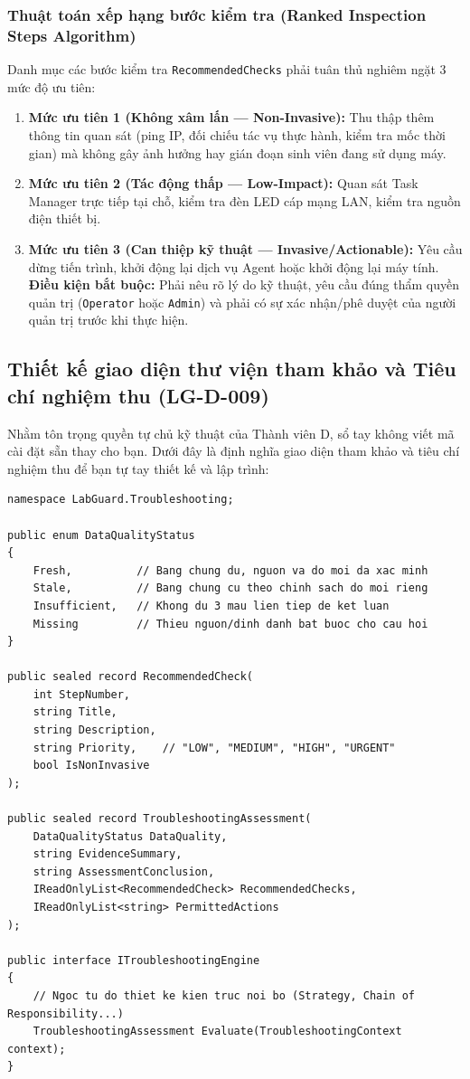 \documentclass[12pt,a4paper]{article}
\begin{document}
\subsubsection{Thuật toán xếp hạng bước kiểm tra (Ranked Inspection Steps Algorithm)}
Danh mục các bước kiểm tra \texttt{RecommendedChecks} phải tuân thủ nghiêm ngặt 3 mức độ ưu tiên:
\begin{enumerate}
  \item \textbf{Mức ưu tiên 1 (Không xâm lấn --- Non-Invasive):} Thu thập thêm thông tin quan sát (ping IP, đối chiếu tác vụ thực hành, kiểm tra mốc thời gian) mà không gây ảnh hưởng hay gián đoạn sinh viên đang sử dụng máy.
  \item \textbf{Mức ưu tiên 2 (Tác động thấp --- Low-Impact):} Quan sát Task Manager trực tiếp tại chỗ, kiểm tra đèn LED cáp mạng LAN, kiểm tra nguồn điện thiết bị.
  \item \textbf{Mức ưu tiên 3 (Can thiệp kỹ thuật --- Invasive/Actionable):} Yêu cầu dừng tiến trình, khởi động lại dịch vụ Agent hoặc khởi động lại máy tính. \textbf{Điều kiện bắt buộc:} Phải nêu rõ lý do kỹ thuật, yêu cầu đúng thẩm quyền quản trị (\texttt{Operator} hoặc \texttt{Admin}) và phải có sự xác nhận/phê duyệt của người quản trị trước khi thực hiện.
\end{enumerate}

\subsection{Thiết kế giao diện thư viện tham khảo và Tiêu chí nghiệm thu (LG-D-009)}
Nhằm tôn trọng quyền tự chủ kỹ thuật của Thành viên D, sổ tay không viết mã cài đặt sẵn thay cho bạn. Dưới đây là định nghĩa giao diện tham khảo và tiêu chí nghiệm thu để bạn tự tay thiết kế và lập trình:

\begin{lstlisting}[language=CSharp, caption={Giao diện hợp đồng tham khảo của thư viện LabGuard.Troubleshooting}]
namespace LabGuard.Troubleshooting;

public enum DataQualityStatus
{
    Fresh,          // Bang chung du, nguon va do moi da xac minh
    Stale,          // Bang chung cu theo chinh sach do moi rieng
    Insufficient,   // Khong du 3 mau lien tiep de ket luan
    Missing         // Thieu nguon/dinh danh bat buoc cho cau hoi
}

public sealed record RecommendedCheck(
    int StepNumber,
    string Title,
    string Description,
    string Priority,    // "LOW", "MEDIUM", "HIGH", "URGENT"
    bool IsNonInvasive
);

public sealed record TroubleshootingAssessment(
    DataQualityStatus DataQuality,
    string EvidenceSummary,
    string AssessmentConclusion,
    IReadOnlyList<RecommendedCheck> RecommendedChecks,
    IReadOnlyList<string> PermittedActions
);

public interface ITroubleshootingEngine
{
    // Ngoc tu do thiet ke kien truc noi bo (Strategy, Chain of Responsibility...)
    TroubleshootingAssessment Evaluate(TroubleshootingContext context);
}
\end{lstlisting}
\end{document}
